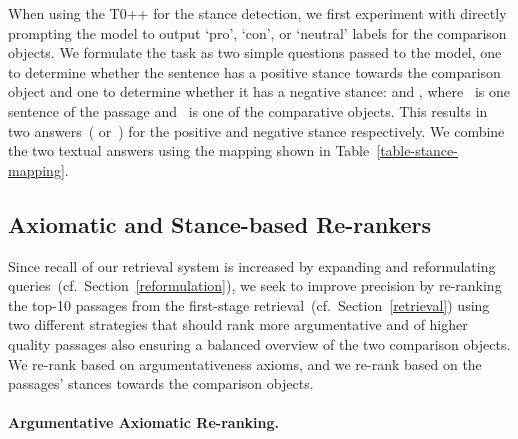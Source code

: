 When using the T0++ for the stance detection, we first experiment with directly prompting the model to output `pro', `con',  or `neutral' labels for the comparison objects.
We formulate the task as two simple questions passed to the model, one to determine whether the sentence has a positive stance towards the comparison object and one to determine whether it has a negative stance:  and , where ~is one sentence of the passage and ~is one of the comparative objects.
This results in two answers~( or~) for the positive and negative stance respectively. We combine the two textual answers using the mapping shown in Table~\ref{table-stance-mapping}.

\subsection{Axiomatic and Stance-based Re-rankers}
\label{reranking}


Since recall of our retrieval system is increased by expanding and reformulating queries~(cf.\ Section~\ref{reformulation}), we seek to improve precision by re-ranking the top-10 passages from the first-stage retrieval~(cf.\ Section~\ref{retrieval}) using two different strategies that should rank more argumentative and of higher quality passages also ensuring a balanced overview of the two comparison objects. \Ni We re-rank based on argumentativeness axioms, and \Nii we re-rank based on the passages' stances towards the comparison objects.

\paragraph{Argumentative Axiomatic Re-ranking.}

